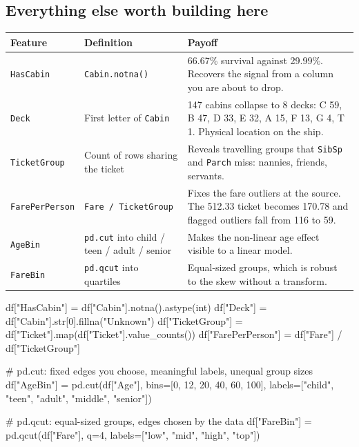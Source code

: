 \documentclass[11pt,a4paper]{article}
\begin{document}


\subsection{Everything else worth building here}

\begin{tabularx}{\textwidth}{@{}l X X@{}}
\toprule
\rowcolor{tablehead} \textbf{Feature} & \textbf{Definition} & \textbf{Payoff} \\
\midrule
\texttt{HasCabin} & \lstinline|Cabin.notna()| & 66.67\% survival against 29.99\%. Recovers the signal from a column you are about to drop. \\
\texttt{Deck} & First letter of \texttt{Cabin} & 147 cabins collapse to 8 decks: C 59, B 47, D 33, E 32, A 15, F 13, G 4, T 1. Physical location on the ship. \\
\texttt{TicketGroup} & Count of rows sharing the ticket & Reveals travelling groups that \texttt{SibSp} and \texttt{Parch} miss: nannies, friends, servants. \\
\texttt{FarePerPerson} & \lstinline|Fare / TicketGroup| & Fixes the fare outliers at the source. The 512.33 ticket becomes 170.78 and flagged outliers fall from 116 to 59. \\
\texttt{AgeBin} & \lstinline|pd.cut| into child / teen / adult / senior & Makes the non-linear age effect visible to a linear model. \\
\texttt{FareBin} & \lstinline|pd.qcut| into quartiles & Equal-sized groups, which is robust to the skew without a transform. \\
\bottomrule
\end{tabularx}

\begin{py}
df["HasCabin"]      = df["Cabin"].notna().astype(int)
df["Deck"]          = df["Cabin"].str[0].fillna("Unknown")
df["TicketGroup"]   = df["Ticket"].map(df["Ticket"].value_counts())
df["FarePerPerson"] = df["Fare"] / df["TicketGroup"]

# pd.cut: fixed edges you choose, meaningful labels, unequal group sizes
df["AgeBin"] = pd.cut(df["Age"], bins=[0, 12, 20, 40, 60, 100],
                      labels=["child", "teen", "adult", "middle", "senior"])

# pd.qcut: equal-sized groups, edges chosen by the data
df["FareBin"] = pd.qcut(df["Fare"], q=4, labels=["low", "mid", "high", "top"])
\end{py}
\end{document}
